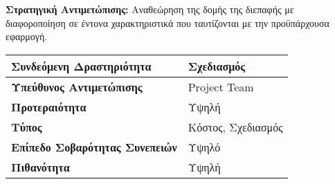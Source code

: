 \documentclass{article}
\newcommand\T{\rule{0pt}{2.6ex}}       %
\newcommand\B{\rule[-1.2ex]{0pt}{0pt}}
\begin{document}
\textbf{Στρατηγική Αντιμετώπισης:} Αναθεώρηση της δομής της διεπαφής με διαφοροποίηση σε έντονα χαρακτηριστικά που ταυτίζονται με την προϋπάρχουσα εφαρμογή.\\
 
 \begin{center}
     \begin{tabular}{|l|l|}
     \hline
      \textbf{Συνδεόμενη Δραστηριότητα} & Σχεδιασμός \T\B \\ 
      \hline
      \textbf{Υπεύθυνος Αντιμετώπισης} & Project Team \T\B \\
      \hline
      \textbf{Προτεραιότητα} & Υψηλή \T\B \\
      \hline
      \textbf{Τύπος} & Κόστος, Σχεδιασμός \T\B \\
      \hline
      \textbf{Επίπεδο Σοβαρότητας Συνεπειών} & Υψηλό \T\B \\
      \hline
      \textbf{Πιθανότητα} & Υψηλή \T\B \\
      \hline
     \end{tabular}
 \end{center}
\end{document}
